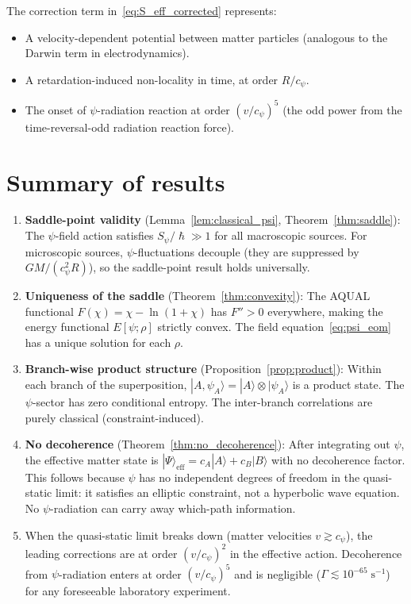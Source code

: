 \documentclass[12pt,a4paper]{article}
\theoremstyle{definition}
\theoremstyle{remark}
\newcommand{\hbar}{\hslash}
\begin{document}
The correction term in~\eqref{eq:S_eff_corrected} represents:
\begin{itemize}
\item A velocity-dependent potential between matter particles (analogous to
the Darwin term in electrodynamics).
\item A retardation-induced non-locality in time, at order $R/c_\psi$.
\item The onset of $\psi$-radiation reaction at order $(v/c_\psi)^5$
(the odd power from the time-reversal-odd radiation reaction force).
\end{itemize}

\section{Summary of results}
\label{sec:summary}

\begin{enumerate}
\item[\textbf{(a)}] \textbf{Saddle-point validity}
(Lemma~\ref{lem:classical_psi}, Theorem~\ref{thm:saddle}):
The $\psi$-field action satisfies $S_\psi/\hbar \gg 1$ for all macroscopic
sources.  For microscopic sources, $\psi$-fluctuations decouple (they are
suppressed by $GM/(c_\psi^2 R)$), so the saddle-point result holds universally.

\item[\textbf{(b)}] \textbf{Uniqueness of the saddle}
(Theorem~\ref{thm:convexity}):
The AQUAL functional $F(\chi) = \chi - \ln(1+\chi)$ has $F'' > 0$ everywhere,
making the energy functional $E[\psi;\rho]$ strictly convex.  The field
equation~\eqref{eq:psi_eom} has a unique solution for each $\rho$.

\item[\textbf{(c)}] \textbf{Branch-wise product structure}
(Proposition~\ref{prop:product}):
Within each branch of the superposition, $|A,\psi_A\rangle = |A\rangle \otimes |\psi_A\rangle$
is a product state.  The $\psi$-sector has zero conditional entropy.
The inter-branch correlations are purely classical (constraint-induced).

\item[\textbf{(d)}] \textbf{No decoherence} (Theorem~\ref{thm:no_decoherence}):
After integrating out $\psi$, the effective matter state is
$|\Psi\rangle_{\mathrm{eff}} = c_A|A\rangle + c_B|B\rangle$ with no
decoherence factor.  This follows because $\psi$ has no independent
degrees of freedom in the quasi-static limit: it satisfies an elliptic
constraint, not a hyperbolic wave equation.  No $\psi$-radiation can carry
away which-path information.

\item[\textbf{Post-static corrections:}] When the quasi-static limit breaks
down (matter velocities $v \gtrsim c_\psi$), the leading corrections are at
order $(v/c_\psi)^2$ in the effective action.  Decoherence from $\psi$-radiation
enters at order $(v/c_\psi)^5$ and is negligible ($\Gamma \lesssim 10^{-65}\;\mathrm{s^{-1}}$)
for any foreseeable laboratory experiment.
\end{enumerate}
\end{document}
